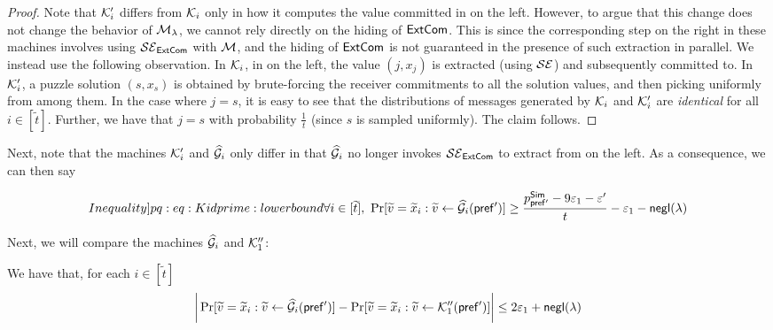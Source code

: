 \begin{proof}
Note that $\mathcal{K}_i'$ differs from $\mathcal{K}_i$ only in how it computes the value committed in  on the left. However, to argue that this change does not change the behavior of $\mathcal{M}_\lambda$, we cannot rely directly on the hiding of $\mathsf{ExtCom}$. This is since the corresponding step on the right in these machines involves using $\mathcal{SE}_\mathsf{ExtCom}$ with $\mathcal{M}$, and the hiding of $\mathsf{ExtCom}$ is not guaranteed in the presence of such extraction in parallel. We instead use the following observation. In $\mathcal{K}_i$, in  on the left, the value $(j,x_j)$ is extracted (using $\mathcal{SE}$) and subsequently committed to. In $\mathcal{K}_i'$, a puzzle solution $(s,x_s)$ is obtained by brute-forcing the receiver commitments to all the solution values, and then picking uniformly from among them. In the case where $j=s$, it is easy to see that the distributions of messages generated by $\mathcal{K}_i$ and $\mathcal{K}_i'$ are {\em identical} for all $i \in [\tilde{t}]$. Further, we have that $j=s$ with probability $\frac{1}{t}$ (since $s$ is sampled uniformly). The claim follows. 

\end{proof}

Next, note that the machines $\mathcal{K}_i'$ and $\mathcal{\widehat{G}}_i$ only differ in that $\mathcal{\widehat{G}}_i$ no longer invokes $\mathcal{SE}_\mathsf{ExtCom}$ to extract from  on the left. As a consequence, we can then say  

\begin{equation}\label[Inequality]{pq:eq:Kidprime:lowerbound}
\forall i \in [\tilde{t}],~\Pr[\tilde{v} = \tilde{x}_i: \tilde{v} \gets \mcal{\hat{G}}_i(\msf{pref'})] \geq \frac{p^{\msf{Sim}}_{\msf{pref'}} - 9\epsilon_1 - \epsilon'}{t} -\epsilon_1 -\negl(\secpar)
\end{equation}

Next, we will compare the machines $\mathcal{\widehat{G}}_i$ and $\mathcal{K}_1''$: 

\begin{MyClaim}\label{pq:claim:Kidprime:similarity}
We have that, for each $i \in [\tilde{t}]$
$$ \bigg| \Pr[\widetilde{v} = \widetilde{x}_i: \widetilde{v} \gets \mathcal{\widehat{G}}_i(\mathsf{pref'})] - \Pr[\widetilde{v} = \widetilde{x}_i: \widetilde{v} \gets \mathcal{K}_1''(\mathsf{pref'})] \bigg| \leq 2\varepsilon_1 + \mathsf{negl}(\lambda)$$
\end{MyClaim}


